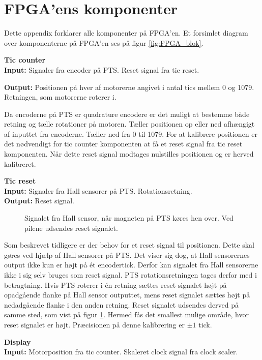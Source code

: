 \section{FPGA'ens komponenter}
\label{sec:fpgaappendix}
Dette appendix forklarer alle komponenter på FPGA'en.
Et forsimlet diagram over komponenterne på FPGA'en ses på figur \ref{fig:FPGA_blok}.


\textbf{Tic counter}\\
\textbf{Input:}
Signaler fra encoder på PTS. Reset signal fra tic reset.

\textbf{Output:} Positionen på hver af motorerne angivet i antal tics mellem 0 
og 1079. Retningen, som motorerne roterer i. 

Da encoderne på PTS er quadrature encodere er det muligt at bestemme både retning og 
tælle rotationer på motoren.
Tæller positionen op eller ned afhængigt af inputtet fra encoderne. 
Tæller ned fra 0 til 1079.
For at kalibrere positionen er det nødvendigt for tic counter komponenten at få 
et reset signal fra tic reset komponenten. 
Når dette reset signal modtages nulstilles positionen og er herved kalibreret.

\textbf{Tic reset}\\
\textbf{Input:} Signaler fra Hall sensorer på PTS. Rotationsretning.\\
\textbf{Output:} Reset signal.

\begin{figure}[!th]
\centering

\caption[Signal fra Hall sensor]{Signalet fra Hall sensor, når magneten på PTS køres hen over. Ved pilene udsendes reset signalet.}
\label{fig:hall_sensor_signal}
\end{figure}

Som beskrevet tidligere er der behov for et reset signal til positionen. 
Dette skal gøres ved hjælp af Hall sensorer på PTS. 
Det viser sig dog, at Hall sensorernes output ikke kun er højt på ét encodertick. 
Derfor kan signalet fra Hall sensorerne ikke i sig selv bruges som reset signal.
PTS rotationsretningen tages derfor med i betragtning.
Hvis PTS roterer i én retning sættes reset signalet højt på opadgående 
flanke på Hall sensor outputtet, mens reset signalet sættes højt på nedadgående 
flanke i den anden retning. Reset signalet udsendes derved på samme sted, som vist på figur \ref{fig:hall_sensor_signal}.
Hermed fås det smallest mulige område, hvor reset signalet er højt.
Præcisionen på denne kalibrering er \(\pm1\) tick.

\textbf{Display}\\
\textbf{Input:} Motorposition fra tic counter. Skaleret clock signal fra clock 
scaler.

